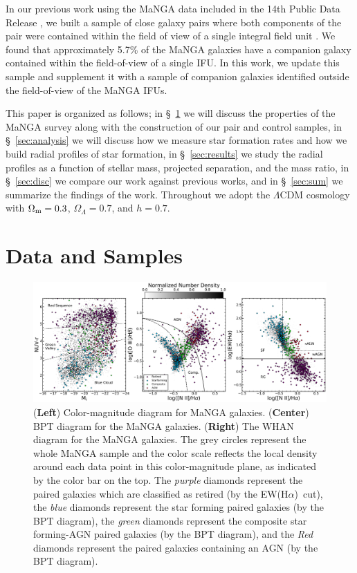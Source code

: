 \documentclass[apj,twocolumn]{emulateapj}
\newcommand{\ewha}{EW(H$\alpha$)}
\begin{document}
\begin{CJK*}{UTF8}{gbsn}
In our previous work using the MaNGA data included in the 14th Public Data Release \citep[DR14;][]{Abolfathi:2018}, we built a sample of close galaxy pairs where both components of the pair were contained within the field of view of a single integral field unit \citep[][hereafter ]{Fu:2018}. We found that approximately 5.7\% of the MaNGA galaxies have a companion galaxy contained within the field-of-view of a single IFU. In this work, we update this sample and supplement it with a sample of companion galaxies identified outside the field-of-view of the MaNGA IFUs. 

This paper is organized as follows; in \S~\ref{sec:data} we will discuss the properties of the MaNGA survey along with the construction of our pair and control samples, in \S~\ref{sec:analysis} we will discuss how we measure star formation rates and how we build radial profiles of star formation, in \S~\ref{sec:results} we study the radial profiles as a function of stellar mass, projected separation, and the mass ratio, in \S~\ref{sec:disc} we compare our work against previous works, and in \S~\ref{sec:sum} we summarize the findings of the work. 
Throughout we adopt the $\Lambda$CDM cosmology with $\Omega_{\rm m}=0.3$, $\Omega_\Lambda=0.7$, and $h=0.7$. 

\section{Data and Samples}\label{sec:data}

\begin{figure}
\centering
\includegraphics[width=\linewidth]{bpt-cmd.pdf}
\caption[]{(\textbf{Left}) Color-magnitude diagram for MaNGA galaxies. (\textbf{Center}) BPT diagram for the MaNGA galaxies. (\textbf{Right}) The WHAN diagram for the MaNGA galaxies. The grey circles represent the whole MaNGA sample and the color scale reflects the local density around each data point in this color-magnitude plane, as indicated by the color bar on the top. The {\it purple} diamonds represent the paired galaxies which are classified as retired (by the \ewha\ cut), the {\it blue} diamonds represent the star forming paired galaxies (by the BPT diagram), the {\it green} diamonds represent the composite star forming-AGN paired galaxies (by the BPT diagram), and the {\it Red} diamonds represent the paired galaxies containing an AGN (by the BPT diagram).}
\label{fig:cmd}
\end{figure}


\end{CJK*}
\end{document}
